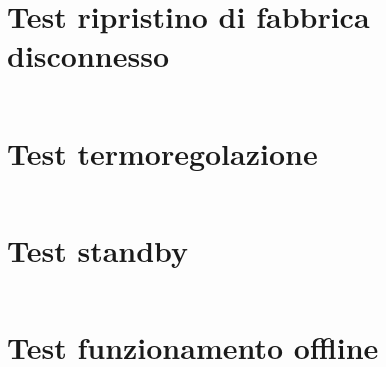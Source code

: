 \documentclass[12pt,a4paper,twoside,titlepage]{book}
\begin{document}
\section{Test ripristino di fabbrica disconnesso}
\label{section:impl_test_factory_reset_unbounded}
\inputminted[]{python3}{src/test_factory_reset_unbounded.py}

\section{Test termoregolazione}
\label{section:impl_test_thermoregulation}
\inputminted[]{python3}{src/test_thermoregulation.py}

\section{Test standby}
\label{section:impl_test_standby}
\inputminted[]{python3}{src/test_standby.py}

\section{Test funzionamento offline}
\label{section:impl_test_offline_working}
\inputminted[]{python3}{src/test_offline_working.py}

\clearpage

\printglossary
\printglossary[type=\acronymtype]
\end{document}

